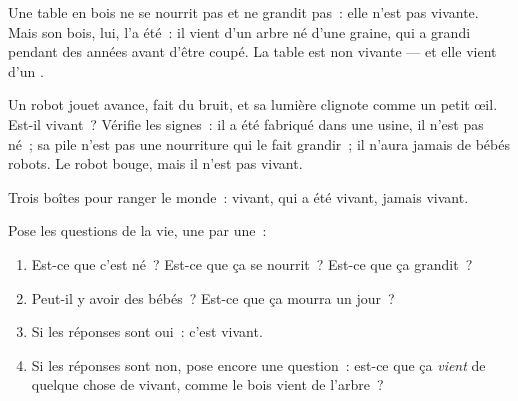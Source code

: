 \begin{example}\label{ex:g1:living-or-not:table}
Une table en bois ne se nourrit pas et ne grandit pas~: elle n'est
pas vivante. Mais son bois, lui, l'a été~: il vient d'un arbre né
d'une graine, qui a grandi pendant des années avant d'être coupé. La
table est non vivante --- et elle vient d'un .
\end{example}

\begin{example}\label{ex:g1:living-or-not:robot}
Un robot jouet avance, fait du bruit, et sa lumière clignote comme
un petit œil. Est-il vivant~? Vérifie les signes~: il a été fabriqué
dans une usine, il n'est pas né~; sa pile n'est pas une nourriture
qui le fait grandir~; il n'aura jamais de bébés robots. Le robot
bouge, mais il n'est pas vivant.
\end{example}

\begin{omfigure}

{\small Trois boîtes pour ranger le monde~: vivant, qui a été
vivant, jamais vivant.}
\end{omfigure}

\begin{method}\label{met:g1:living-or-not:decide}
Pose les questions de la vie, une par une~:
\begin{enumerate}
  \item Est-ce que c'est né~? Est-ce que ça se nourrit~? Est-ce que
        ça grandit~?
  \item Peut-il y avoir des bébés~? Est-ce que ça mourra un jour~?
  \item Si les réponses sont oui~: c'est vivant.
  \item Si les réponses sont non, pose encore une question~: est-ce
        que ça \emph{vient} de quelque chose de vivant, comme le
        bois vient de l'arbre~?
\end{enumerate}
\end{method}

